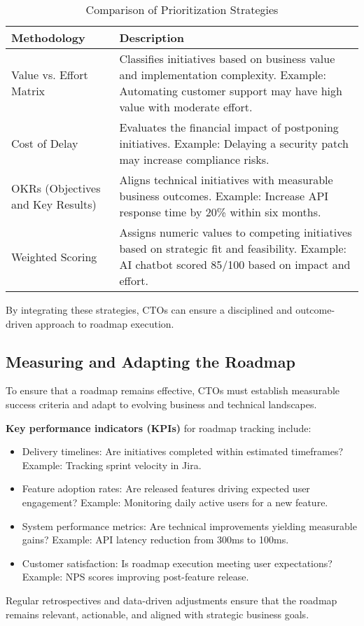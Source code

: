 \begin{table}[h]
    \centering
    \begin{tabular}{|l|p{10cm}|}
        \hline
        \textbf{Methodology}              & \textbf{Description}                                                                                                                                         \\
        \hline
        Value vs. Effort Matrix           & Classifies initiatives based on business value and implementation complexity. Example: Automating customer support may have high value with moderate effort. \\
        Cost of Delay                     & Evaluates the financial impact of postponing initiatives. Example: Delaying a security patch may increase compliance risks.                                  \\
        OKRs (Objectives and Key Results) & Aligns technical initiatives with measurable business outcomes. Example: Increase API response time by 20\% within six months.                               \\
        Weighted Scoring                  & Assigns numeric values to competing initiatives based on strategic fit and feasibility. Example: AI chatbot scored 85/100 based on impact and effort.        \\
        \hline
    \end{tabular}
    \caption{Comparison of Prioritization Strategies}
\end{table}

By integrating these strategies, CTOs can ensure a disciplined and outcome-driven approach to roadmap execution.

\subsection{Measuring and Adapting the Roadmap}

To ensure that a roadmap remains effective, CTOs must establish measurable success criteria and adapt to evolving business and technical landscapes.

\textbf{Key performance indicators (KPIs)} for roadmap tracking include:
\begin{itemize}
    \item Delivery timelines: Are initiatives completed within estimated timeframes? Example: Tracking sprint velocity in Jira.
    \item Feature adoption rates: Are released features driving expected user engagement? Example: Monitoring daily active users for a new feature.
    \item System performance metrics: Are technical improvements yielding measurable gains? Example: API latency reduction from 300ms to 100ms.
    \item Customer satisfaction: Is roadmap execution meeting user expectations? Example: NPS scores improving post-feature release.
\end{itemize}

Regular retrospectives and data-driven adjustments ensure that the roadmap remains relevant, actionable, and aligned with strategic business goals.